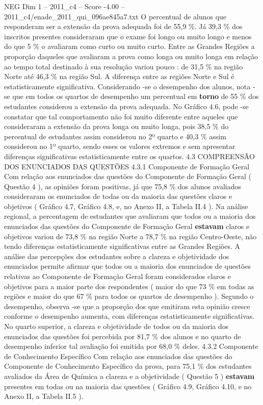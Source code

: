 \begin{textsample}{NEG Dim 1 – 2011\_c4 – Score -4.00 – 2011\_c4/enade\_2011\_qui\_096ae845a7.txt}
O percentual de alunos que responderam ser a extensão da prova adequada foi de 55,9 \%.
Já 39,3 \% dos inscritos presentes consideraram que o exame foi longo ou muito longo e menos do que 5 \% o avaliaram como curto ou muito curto.
Entre as Grandes Regiões a proporção daqueles que avaliaram a prova como longa ou muito longa em relação ao tempo total destinado à sua resolução variou pouco : de 31,5 \% na região Norte até 46,3 \% na região Sul.
A diferença entre as regiões Norte e Sul é estatisticamente significativa.
Considerando -se o desempenho dos alunos, nota -se que em todos os quartos de desempenho um percentual em \textbf{torno} de 55 \% dos estudantes considerou a extensão da prova adequada.
No Gráfico 4.6, pode -se constatar que tal comportamento não foi muito diferente entre aqueles que consideraram a extensão da prova longa ou muito longa, pois 38,5 \% do percentual de estudantes assim considerou no 2º quarto e 40,3 \% assim considerou no 1º quarto, sendo esses os valores extremos e sem apresentar diferenças significativas estatisticamente entre os quartos. 4.3 COMPREENSÃO DOS ENUNCIADOS DAS QUESTÕES 4.3.1 Componente de Formação Geral Com relação aos enunciados das questões do Componente de Formação Geral ( Questão 4 ), as opiniões foram positivas, já que 75,8 \% dos alunos avaliados consideraram os enunciados de todas ou da maioria das questões claros e objetivos ( Gráfico 4.7, Gráfico 4.8, e, no Anexo II, a Tabela II.4 ).
Na análise regional, a percentagem de estudantes que avaliaram que todos ou a maioria dos enunciados das questões do Componente de Formação Geral \textbf{estavam} claros e objetivos variou de 73,8 \% na região Norte a 78,7 \% na região Centro-Oeste, não tendo diferenças estatisticamente significativas entre as Grandes Regiões.
A análise das percepções dos estudantes sobre a clareza e objetividade dos enunciados permite afirmar que todos ou a maioria dos enunciados de questões relativas ao Componente de Formação Geral foram considerados claros e objetivos para a maior parte dos respondentes ( maior do que 73 \% em todas as regiões e maior do que 67 \% para todos os quartos de desempenho ).
Segundo o desempenho, observa -se que a proporção dos que emitiram esta opinião cresce conforme o desempenho aumenta, com diferenças estatisticamente significativas.
No quarto superior, a clareza e objetividade de todos ou da maioria dos enunciados das questões foi percebida por 81,7 \% dos alunos e no quarto de desempenho inferior tal avaliação foi emitida por 68,0 \% deles. 4.3.2 Componente de Conhecimento Específico Com relação aos enunciados das questões do Componente de Conhecimento Específico da prova, para 75,1 \% dos estudantes avaliados da Área de Química a clareza e a objetividade ( Questão 5 ) \textbf{estavam} presentes em todas ou na maioria das questões ( Gráfico 4.9, Gráfico 4.10, e no Anexo II, a Tabela II.5 ).

\end{textsample}
